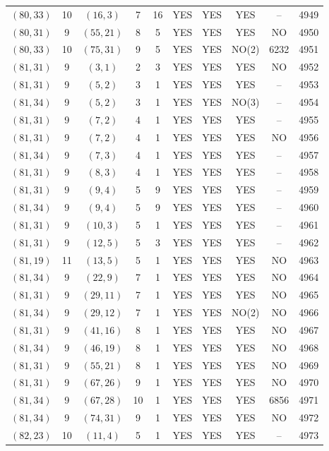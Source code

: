\begin{longtable}{|c|c|c|c|c|c|c|c|c|c|}
$(80, 33)$ & 10 & $(16, 3)$ & 7 & 16 & YES & YES & YES & -- & 4949\\
$(80, 31)$ & 9 & $(55, 21)$ & 8 & 5 & YES & YES & YES & NO & 4950\\
$(80, 33)$ & 10 & $(75, 31)$ & 9 & 5 & YES & YES & NO(2) & 6232 & 4951\\
$(81, 31)$ & 9 & $(3, 1)$ & 2 & 3 & YES & YES & YES & NO & 4952\\
$(81, 31)$ & 9 & $(5, 2)$ & 3 & 1 & YES & YES & YES & -- & 4953\\
$(81, 34)$ & 9 & $(5, 2)$ & 3 & 1 & YES & YES & NO(3) & -- & 4954\\
$(81, 31)$ & 9 & $(7, 2)$ & 4 & 1 & YES & YES & YES & -- & 4955\\
$(81, 31)$ & 9 & $(7, 2)$ & 4 & 1 & YES & YES & YES & NO & 4956\\
$(81, 34)$ & 9 & $(7, 3)$ & 4 & 1 & YES & YES & YES & -- & 4957\\
$(81, 31)$ & 9 & $(8, 3)$ & 4 & 1 & YES & YES & YES & -- & 4958\\
$(81, 31)$ & 9 & $(9, 4)$ & 5 & 9 & YES & YES & YES & -- & 4959\\
$(81, 34)$ & 9 & $(9, 4)$ & 5 & 9 & YES & YES & YES & -- & 4960\\
$(81, 31)$ & 9 & $(10, 3)$ & 5 & 1 & YES & YES & YES & -- & 4961\\
$(81, 31)$ & 9 & $(12, 5)$ & 5 & 3 & YES & YES & YES & -- & 4962\\
$(81, 19)$ & 11 & $(13, 5)$ & 5 & 1 & YES & YES & YES & NO & 4963\\
$(81, 34)$ & 9 & $(22, 9)$ & 7 & 1 & YES & YES & YES & NO & 4964\\
$(81, 31)$ & 9 & $(29, 11)$ & 7 & 1 & YES & YES & YES & NO & 4965\\
$(81, 34)$ & 9 & $(29, 12)$ & 7 & 1 & YES & YES & NO(2) & NO & 4966\\
$(81, 31)$ & 9 & $(41, 16)$ & 8 & 1 & YES & YES & YES & NO & 4967\\
$(81, 34)$ & 9 & $(46, 19)$ & 8 & 1 & YES & YES & YES & NO & 4968\\
$(81, 31)$ & 9 & $(55, 21)$ & 8 & 1 & YES & YES & YES & NO & 4969\\
$(81, 31)$ & 9 & $(67, 26)$ & 9 & 1 & YES & YES & YES & NO & 4970\\
$(81, 34)$ & 9 & $(67, 28)$ & 10 & 1 & YES & YES & YES & 6856 & 4971\\
$(81, 34)$ & 9 & $(74, 31)$ & 9 & 1 & YES & YES & YES & NO & 4972\\
$(82, 23)$ & 10 & $(11, 4)$ & 5 & 1 & YES & YES & YES & -- & 4973\\

\end{longtable}
